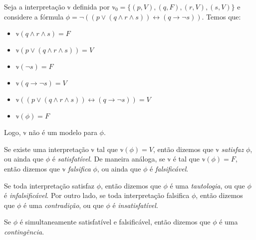 \begin{example}
    Seja a interpretação $\mathbb{v}$ definida por $\mathbb{v}_0 = \{(p,V),(q,F),(r,V),(s,V)\}$ e considere a fórmula $\phi = \neg((p \vee (q \wedge r \wedge s)) \leftrightarrow (q \rightarrow \neg s))$. Temos que:
    \begin{itemize}
        \item $\mathbb{v}(q \wedge r \wedge s) = F$
        \item $\mathbb{v}(p \vee (q \wedge r \wedge s)) = V$
        \item $\mathbb{v}(\neg s) = F$
        \item $\mathbb{v}(q \rightarrow \neg s) = V$
        \item $\mathbb{v}((p \vee (q \wedge r \wedge s)) \leftrightarrow (q \rightarrow \neg s)) = V$
        \item $\mathbb{v}(\phi) = F$
    \end{itemize}
    Logo, $\mathbb{v}$ não é um modelo para $\phi$.
\end{example}

\begin{definition}
	Se existe uma interpretação $\mathbb{v}$ tal que $\mathbb{v}(\phi) = V$, então dizemos que $\mathbb{v}$ \emph{satisfaz} $\phi$, ou ainda que $\phi$ é \emph{satisfatível}. De maneira análoga, se $\mathbb{v}$ é tal que $\mathbb{v}(\phi) = F$, então dizemos que $\mathbb{v}$ \emph{falsifica} $\phi$, ou ainda que $\phi$ é \emph{falsificável}.
	
	Se toda interpretação satisfaz $\phi$, então dizemos que $\phi$ é uma \emph{tautologia}, ou que $\phi$ é \emph{infalsificável}. Por outro lado, se toda interpretação falsifica $\phi$, então dizemos que $\phi$ é uma \emph{contradição}, ou que $\phi$ é \emph{insatisfatível}.
	
	Se $\phi$ é simultaneamente satisfatível e falsificável, então dizemos que $\phi$ é uma \emph{contingência}.
\end{definition}

